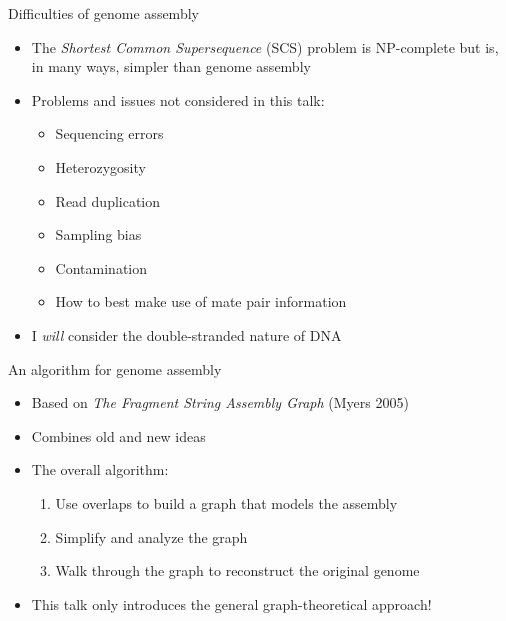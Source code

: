 \documentclass[xcolor=dvipsnames]{beamer}
\begin{document}
\begin{frame}{Difficulties of genome assembly}
    \begin{itemize}
        \item The {\em Shortest Common Supersequence} (SCS) problem is
            NP-complete but is, in many ways, simpler than genome assembly
        \item Problems and issues not considered in this talk:
            \begin{itemize}
                \item Sequencing errors
                \item Heterozygosity
                \item Read duplication
                \item Sampling bias
                \item Contamination
                \item How to best make use of mate pair information
            \end{itemize}
        \item I {\em will} consider the double-stranded nature of DNA
    \end{itemize}
\end{frame}

\begin{frame}{An algorithm for genome assembly}
    \begin{itemize}
        \item Based on {\it The Fragment String Assembly Graph} (Myers 2005)
        \item Combines old and new ideas
        \item The overall algorithm:
        \begin{enumerate}
            \item Use overlaps to build a graph that models the assembly
            \item Simplify and analyze the graph
            \item Walk through the graph to reconstruct the original genome
        \end{enumerate}
        \item This talk only introduces the general graph-theoretical approach!
    \end{itemize}
\end{frame}
\end{document}
